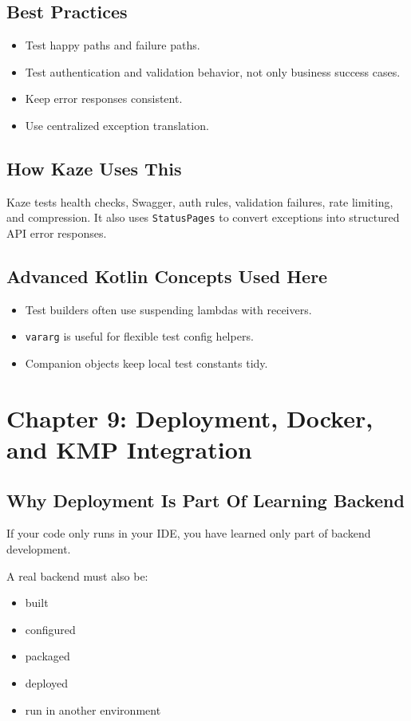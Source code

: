 \documentclass[11pt,a4paper]{article}
\begin{document}
\subsection{Best Practices}

\begin{itemize}
    \item Test happy paths and failure paths.
    \item Test authentication and validation behavior, not only business success cases.
    \item Keep error responses consistent.
    \item Use centralized exception translation.
\end{itemize}

\subsection{How Kaze Uses This}

Kaze tests health checks, Swagger, auth rules, validation failures, rate limiting, and compression. It also uses \texttt{StatusPages} to convert exceptions into structured API error responses.

\subsection{Advanced Kotlin Concepts Used Here}

\begin{itemize}
    \item Test builders often use suspending lambdas with receivers.
    \item \texttt{vararg} is useful for flexible test config helpers.
    \item Companion objects keep local test constants tidy.
\end{itemize}

\section{Chapter 9: Deployment, Docker, and KMP Integration}

\subsection{Why Deployment Is Part Of Learning Backend}

If your code only runs in your IDE, you have learned only part of backend development.

A real backend must also be:
\begin{itemize}
    \item built
    \item configured
    \item packaged
    \item deployed
    \item run in another environment
\end{itemize}
\end{document}
